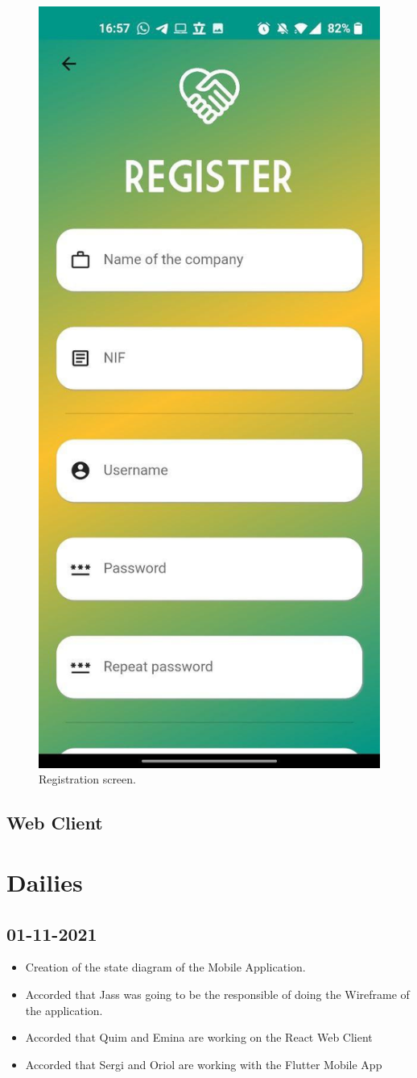 \documentclass[./main.tex]{subfiles}
\begin{document}
\begin{figure}[H]
\centering
\includegraphics[width=0.5\linewidth]{img/mobile-screen-1.jpg}
\caption{Registration screen.}
\label{fig:mobile-screen-1}
\end{figure}


\subsection{Web Client}

\section{Dailies}

\subsection{01-11-2021}
\begin{itemize}
\item Creation of the state diagram of the Mobile Application.
\item Accorded that Jass was going to be the responsible of doing the Wireframe of the application.
\item Accorded that Quim and Emina are working on the React Web Client
\item Accorded that Sergi and Oriol are working with the Flutter Mobile App
\end{itemize}
\end{document}
